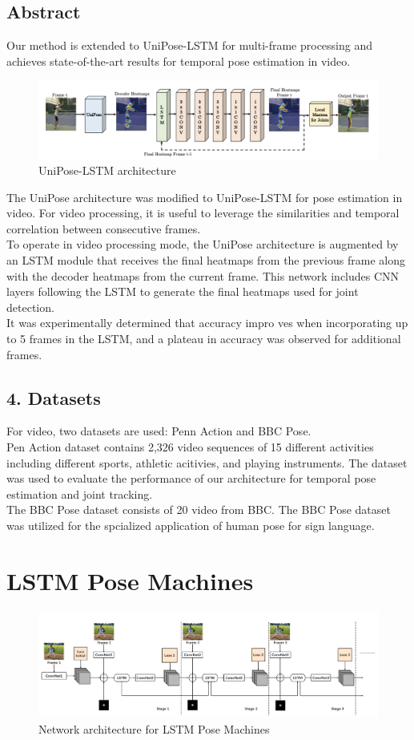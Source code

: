 \documentclass[a4paper]{report}
\begin{document}
\section*{Abstract}
Our method is extended to UniPose-LSTM for multi-frame processing and achieves state-of-the-art results for temporal pose estimation in video. 

\begin{figure}[h]
    \centering
    \includegraphics[width=0.8 \textwidth]{./entities/unipose.PNG}
    \caption{UniPose-LSTM architecture}
    \label{fig:Unipose}
\end{figure}
The UniPose architecture was modified to UniPose-LSTM for pose estimation in video. For video processing, it is useful to leverage the similarities and temporal correlation between consecutive frames.
\\
To operate in video processing mode, the UniPose architecture is augmented by an LSTM module that receives the final heatmaps from the previous frame along with the decoder heatmaps from the current frame. This network includes CNN layers following the LSTM to generate the final heatmaps used for joint detection.
\\
It was experimentally determined that accuracy impro ves when incorporating up to 5 frames in the LSTM, and a plateau in accuracy was observed for additional frames.

\section*{4. Datasets}
For video, two datasets are used: Penn Action and BBC Pose.
\\
Pen Action dataset contains 2,326 video sequences of 15 different activities including different sports, athletic acitivies, and playing instruments. The dataset was used to evaluate the performance of our architecture for temporal pose estimation and joint tracking.
\\
The BBC Pose dataset consists of 20 video from BBC. The BBC Pose dataset was utilized for the spcialized application of human pose for sign language.

\chapter*{LSTM Pose Machines}
\begin{figure}[h]
    \centering
    \includegraphics[width=0.8 \textwidth]{./entities/LSTM_pose_machine.PNG}
    \caption{Network architecture for LSTM Pose Machines}
    \label{fig:LSTM_pose_machine}
\end{figure}
\end{document}
